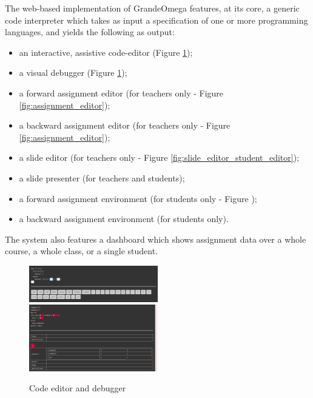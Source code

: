 The web-based implementation of GrandeOmega features, at its core, a generic code interpreter which takes as input a specification of one or more programming languages, and yields the following as output:

\begin{itemize}[noitemsep]
	\item an interactive, assistive code-editor (Figure \ref{fig:code_editor_debugger});
	\item a visual debugger (Figure \ref{fig:code_editor_debugger});
	\item a forward assignment editor (for teachers only - Figure \ref{fig:assignment_editor});
	\item a backward assignment editor (for teachers only - Figure \ref{fig:assignment_editor});
	\item a slide editor (for teachers only - Figure \ref{fig:slide_editor_student_editor});
	\item a slide presenter (for teachers and students);
	\item a forward assignment environment (for students only - Figure );
	\item a backward assignment environment (for students only).
\end{itemize}

The system also features a dashboard which shows assignment data over a whole course, a whole class, or a single student.

\begin{figure}
	\includegraphics[width = 0.5\textwidth]{Figures/code_editor}
	\includegraphics[width = 0.5\textwidth]{Figures/debugger}
	\caption{Code editor and debugger}
	\label{fig:code_editor_debugger}
\end{figure}

